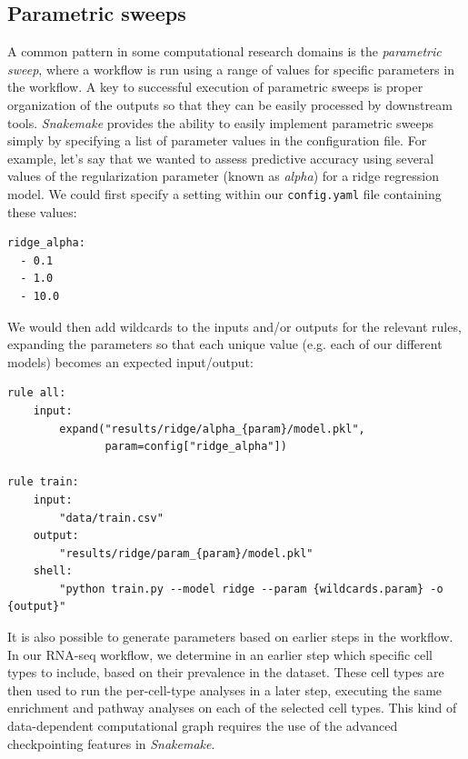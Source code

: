 \subsection{Parametric sweeps}

A common pattern in some computational research domains is the \textit{parametric sweep}, where a workflow is run using a range of values for specific parameters in the workflow.  A key to successful execution of parametric sweeps is proper organization of the outputs so that they can be easily processed by downstream tools.  \textit{Snakemake} provides the ability to easily implement parametric sweeps simply by specifying a list of parameter values in the configuration file.  For example, let's say that we wanted to assess predictive accuracy using several values of the regularization parameter (known as \textit{alpha}) for a ridge regression model.  We could first specify a setting within our \texttt{config.yaml} file containing these values:

\begin{lstlisting}[style=yaml, numbers=none, caption={}]
ridge_alpha:
  - 0.1
  - 1.0
  - 10.0
\end{lstlisting}

We would then add wildcards to the inputs and/or outputs for the relevant rules, expanding the parameters so that each unique value (e.g. each of our different models) becomes an expected input/output:

\begin{lstlisting}[style=Python]
rule all:
    input:
        expand("results/ridge/alpha_{param}/model.pkl",
               param=config["ridge_alpha"])

rule train:
    input:
        "data/train.csv"
    output:
        "results/ridge/param_{param}/model.pkl"
    shell:
        "python train.py --model ridge --param {wildcards.param} -o {output}"
\end{lstlisting}

It is also possible to generate parameters based on earlier steps in the workflow. In our RNA-seq workflow, we determine in an earlier step which specific cell types to include, based on their prevalence in the dataset.  These cell types are then used to run the per-cell-type analyses in a later step, executing the same enrichment and pathway analyses on each of the selected cell types.  This kind of data-dependent computational graph requires the use of the advanced checkpointing features in \textit{Snakemake}.

